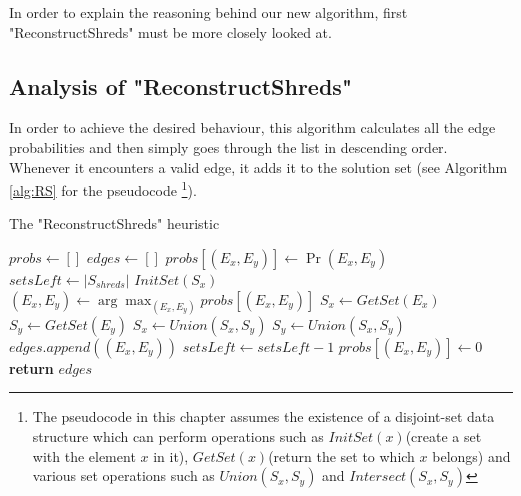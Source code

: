 In order to explain the reasoning behind our new algorithm, first "ReconstructShreds" must be more closely looked at.

\subsection{Analysis of "ReconstructShreds"}
In order to achieve the desired behaviour, this algorithm calculates all the edge probabilities and then simply goes through the list in descending order. Whenever it encounters a valid edge, it adds it to the solution set (see Algorithm \ref{alg:RS} for the pseudocode \footnote{The pseudocode in this chapter assumes the existence of a disjoint-set data structure which can perform operations such as $InitSet(x)$(create a set with the element $x$ in it), $GetSet(x)$(return the set to which $x$ belongs) and various set operations such as $Union(S_x,S_y)$ and $Intersect(S_x,S_y)$}).

\begin{algorithm}[h]
\caption{The "ReconstructShreds" heuristic}
\begin{algorithmic}[1]
\Statex {} 
  \State $probs \gets []$ 
  \State $edges \gets []$ 
      \State $probs[(E_x,E_y)] \gets \Pr(E_x,E_y)$ 
    \EndFor
  \EndFor
  \Statex
  \State $setsLeft \gets |S_{shreds}|$  
    \State $InitSet(S_x)$
  \EndFor
  \Statex
   
    \State $(E_x,E_y) \gets \arg\max_{(E_x,E_y)} probs[(E_x,E_y)]$ 
    \State $S_x \gets GetSet(E_x)$  
    \State $S_y \gets GetSet(E_y)$
      \State $S_x \gets Union(S_x,S_y)$ 
      \State $S_y \gets Union(S_x,S_y)$
      \State $edges.append((E_x,E_y))$
      \State $setsLeft \gets setsLeft - 1$  
    \EndIf
    \State $probs[(E_x,E_y)] \gets 0$  
  \EndWhile
  \Statex
  \State \textbf{return} $edges$  
\EndProcedure
\end{algorithmic}
\label{alg:RS}
\end{algorithm}

